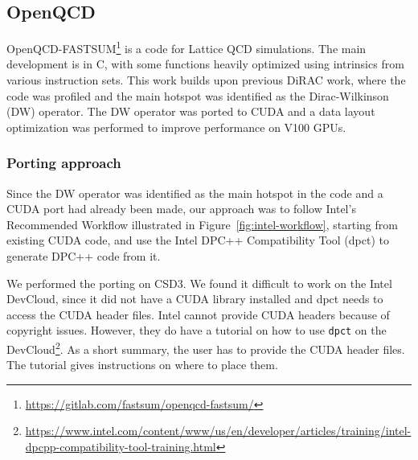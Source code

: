 \documentclass[../main]{subfiles}
\begin{document}
\subsection{OpenQCD}\label{sec:openqcd}

OpenQCD-FASTSUM\footnote{\url{https://gitlab.com/fastsum/openqcd-fastsum/}} is a code for Lattice QCD simulations.
The main development is in C, with some functions heavily optimized using intrinsics from various instruction sets.
This work builds upon previous DiRAC work, where the code was profiled and the main hotspot was identified as the Dirac-Wilkinson (DW) operator.
The DW operator was ported to CUDA and a data layout optimization was performed to improve performance on V100 GPUs.

\subsubsection{Porting approach}\label{sec:openqcd_porting}

Since the DW operator was identified as the main hotspot in the code and a CUDA port had already been made, our approach was to follow Intel's Recommended Workflow illustrated in Figure~\ref{fig:intel-workflow}, starting from existing CUDA code, and use the Intel DPC++ Compatibility Tool (dpct) to generate DPC++ code from it.

We performed the porting on CSD3.
We found it difficult to work on the Intel DevCloud, since it did not have a CUDA library installed and dpct needs to access the CUDA header files.
Intel cannot provide CUDA headers because of copyright issues.
However, they do have a tutorial on how to use \texttt{dpct} on the DevCloud\footnote{\url{https://www.intel.com/content/www/us/en/developer/articles/training/intel-dpcpp-compatibility-tool-training.html}}.
As a short summary, the user has to provide the CUDA header files.
The tutorial gives instructions on where to place them.
\end{document}
